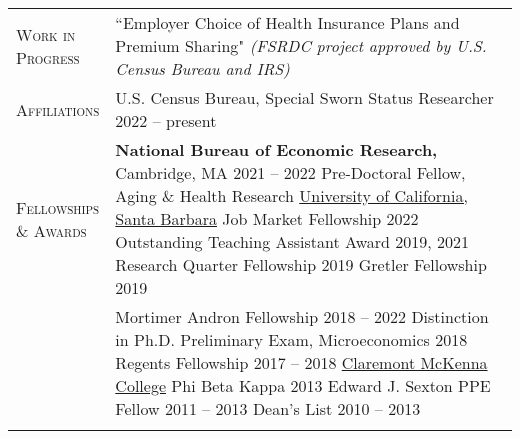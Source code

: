 \documentclass[11pt]{article}
\begin{document}
\begin{tabularx}{\textwidth}{@{}Y Z@{}}
    \textsc{Work in \newline Progress}  & 
    ``Employer Choice of Health Insurance Plans and Premium Sharing" \newline
    \textit{(FSRDC project approved by U.S. Census Bureau and IRS)} 
     \\ \addlinespace[20pt]

	\textsc{Affiliations}  & 
	U.S. Census Bureau, Special Sworn Status Researcher \hfill 2022 -- present%
	\\ \addlinespace[20pt]

	\textsc{Fellowships \newline \& Awards} & 
	\textbf{National Bureau of Economic Research,} Cambridge, MA  \hfill 2021 -- 2022%
	\newline Pre-Doctoral Fellow, Aging \& Health Research
	\vspace{12pt} \newline
	\uline{University of California, Santa Barbara}
	\vspace{3pt} \newline
	Job Market Fellowship \hfill 2022%
	\vspace{3pt} \newline
	Outstanding Teaching Assistant Award \hfill 2019, 2021%
	\vspace{3pt} \newline
	Research Quarter Fellowship \hfill 2019%
	\vspace{3pt} \newline
	Gretler Fellowship \hfill 2019%
	\\ \newpage 
	&
	Mortimer Andron Fellowship \hfill 2018 -- 2022%
	\vspace{3pt} \newline 
	Distinction in Ph.D. Preliminary Exam, Microeconomics \hfill 2018%
	\vspace{3pt} \newline
	Regents Fellowship \hfill 2017 -- 2018%
	\vspace{12pt} \newline
	\uline{Claremont McKenna College}
	\vspace{3pt} \newline
	Phi Beta Kappa \hfill 2013%
	\vspace{3pt} \newline
	Edward J. Sexton PPE Fellow \hfill 2011 -- 2013%
	\vspace{3pt} \newline
	Dean's List \hfill 2010 -- 2013%
	 \\ \addlinespace[20pt] 
	

\end{tabularx}
\end{document}
